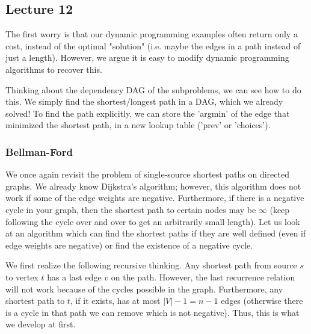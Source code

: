 \subsection{Lecture 12}

The first worry is that our dynamic programming examples
often return only a cost, instead of the optimal "solution" (i.e. maybe the edges in 
a path instead of just a length). However, we argue it is easy to modify dynamic programming algorithms to recover this.

Thinking about the dependency DAG of the subproblems, we can see how to do this. We simply find the shortest/longest path in a DAG,
which we already solved! To find the path explicitly, we can store the 'argmin' of the edge that minimized the shortest path, in
a new lookup table ('prev' or 'choices').

\subsubsection{Bellman-Ford}
We once again revisit the problem of single-source shortest paths on directed graphs.
We already know Dijkstra's algorithm; however, this algorithm does not work if some of the edge weights are negative.
Furthermore, if there is a negative cycle in your graph, then the shortest path to certain nodes may be $\infty$ (keep
following the cycle over and over to get an arbitrarily small length). Let us look at an algorithm which can find
the shortest paths if they are well defined (even if edge weights are negative) or find the existence of a negative cycle.

We first realize the following recursive thinking. Any shortest path from source $s$ to vertex $t$ has a last edge $v$ on
the path. However, the last recurrence relation will not work because of the cycles possible in the graph.
Furthermore, any shortest path to $t$, if it exists, has at most $|V| - 1 = n - 1$ edges (otherwise there is a cycle in that path we can remove which is not
negative). Thus, this is what we develop at first.

